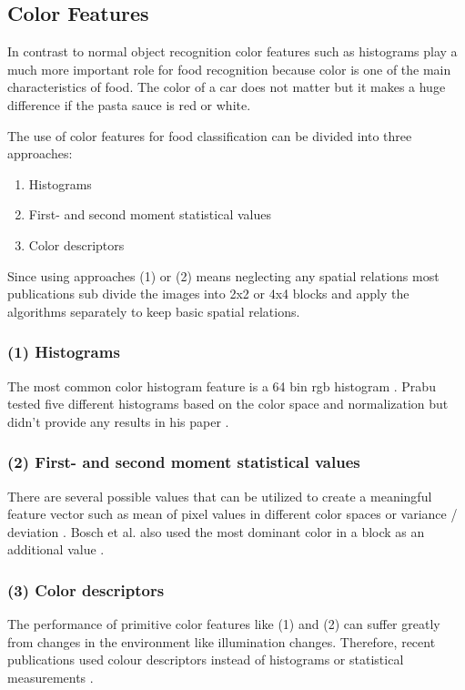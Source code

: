 \subsection{Color Features}
In contrast to normal object recognition color features such as histograms play a much more important role for food recognition because color is one of the main characteristics of food. The color of a car does not matter but it makes a huge difference if the pasta sauce is red or white.

The use of color features for food classification can be divided into three approaches:
\begin{enumerate}
	\item Histograms
	\item First- and second moment statistical values
	\item Color descriptors
\end{enumerate}

Since using approaches {(1)} or {(2)} means neglecting any spatial relations most publications sub divide the images into 2x2 \cite{Joutou2009, Hoashi2010, Kawano2014a} or 4x4 blocks \cite{Chen2012} and apply the algorithms separately to keep basic spatial relations.

\subsubsection*{{(1)} Histograms}
The most common color histogram feature is a 64 bin \gls{rgb} histogram \cite{Joutou2009, Hoashi2010, Chen2009}. Prabu tested five different histograms based on the color space and normalization but didn't provide any results in his paper \cite{Prabu2015}.

\subsubsection*{{(2)} First- and second moment statistical values}
There are several possible values that can be utilized to create a meaningful feature vector such as mean of pixel values in different color spaces \cite{Kitamura2008, Kim2010, Kawano2014a, Bosch2014} or variance / deviation \cite{Kitamura2008, Kawano2014a, Bosch2014}. Bosch et al. also used the most dominant color in a block as an additional value \cite{Bosch2014}.

\subsubsection*{{(3)} Color descriptors}
The performance of primitive color features like {(1)} and {(2)} can suffer greatly from changes in the environment like illumination changes. Therefore, recent publications used colour descriptors instead of histograms or statistical measurements \cite{Beijbom2015, Bettadapura2015}.


